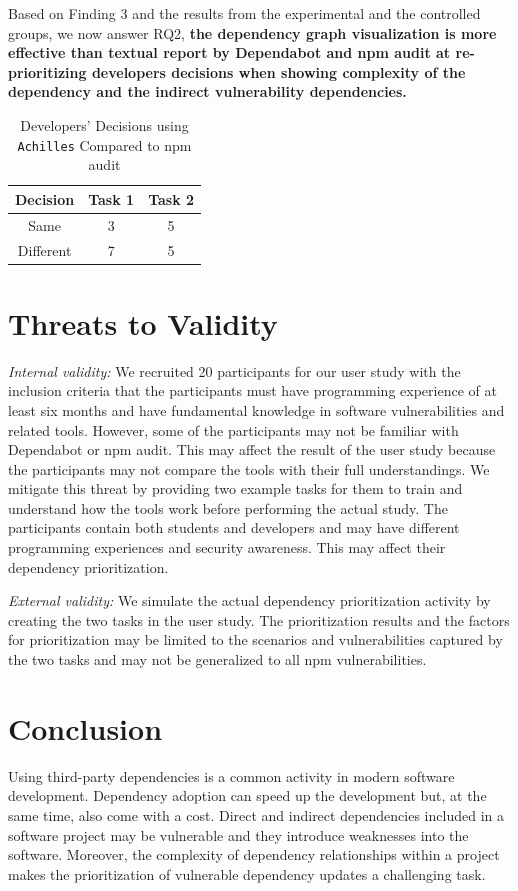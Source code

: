 \documentclass[conference]{IEEEtran}
\begin{document}
	Based on Finding 3 and the results from the experimental and the controlled groups, we now answer RQ2, \textbf{the dependency graph visualization is more effective than textual report by Dependabot and npm audit at re-prioritizing developers decisions when showing complexity of the dependency and the indirect vulnerability dependencies.} 
	
	\begin{table}[tb]
		\centering
		\caption{Developers' Decisions using \texttt{Achilles} Compared to npm audit}
		\begin{tabular}{ccc} 
			\toprule
			Decision & Task 1 & Task 2 \\
			\midrule
			Same & 3 & 5\\ 
			Different & 7 & 5 \\
			\bottomrule
		\end{tabular}
		\label{table:x3}
	\end{table}
	
	\section{Threats to Validity}
	\textit{Internal validity:} We recruited 20 participants for our user study with the inclusion criteria that the participants must have programming experience of at least six months and have fundamental knowledge in software vulnerabilities and related tools. However, some of the participants may not be familiar with Dependabot or npm audit. This may affect the result of the user study because the participants may not compare the tools with their full understandings. We mitigate this threat by providing two example tasks for them to train and understand how the tools work before performing the actual study. The participants contain both students and developers and may have different programming experiences and security awareness. This may affect their dependency prioritization.
	
	\textit{External validity:} We simulate the actual dependency prioritization activity by creating the two tasks in the user study. The prioritization results and the factors for prioritization may be limited to the scenarios and vulnerabilities captured by the two tasks and may not be generalized to all npm vulnerabilities.
	
	\section{Conclusion}
	Using third-party dependencies is a common activity in modern software development. Dependency adoption can speed up the development but, at the same time, also come with a cost. Direct and indirect dependencies included in a software project may be vulnerable and they introduce weaknesses into the software. Moreover, the complexity of dependency relationships within a project makes the prioritization of vulnerable dependency updates a challenging task. 
	
\end{document}
